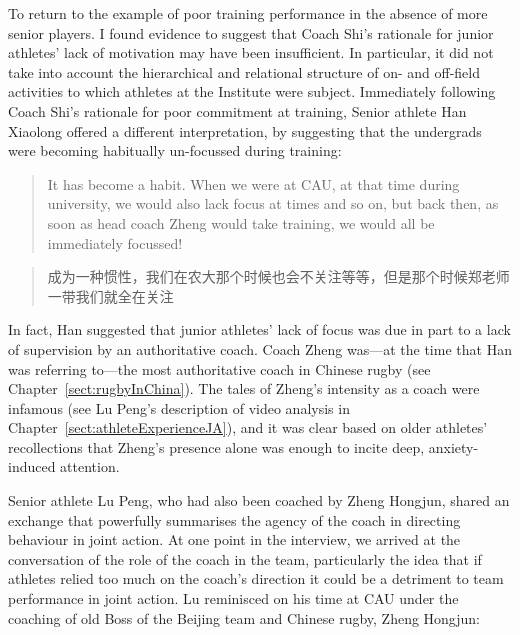 \begin{CJK}{UTF8}{gbsn}
To return to the example of poor training performance in the absence of more senior players. I found evidence to suggest that Coach Shi's rationale for junior athletes' lack of motivation may have been insufficient.  In particular, it did not take into account the hierarchical and relational structure of on- and off-field activities to which athletes at the Institute were subject.  Immediately following Coach Shi's rationale for poor commitment at training, Senior athlete Han Xiaolong offered a different interpretation, by suggesting that the undergrads were becoming habitually un-focussed during training:
     \begin{quote}
       It has become a habit.  When we were at CAU, at that time during university, we would also lack focus at times and so on, but back then, as soon as head coach Zheng would take training, we would all be immediately focussed!
      \end{quote}
      \begin{quote}
       成为一种惯性，我们在农大那个时候也会不关注等等，但是那个时候郑老师一带我们就全在关注
      \end{quote}

In fact, Han suggested that junior athletes' lack of focus was due in part to a lack of supervision by an authoritative coach.  Coach Zheng was---at the time that Han was referring to---the most authoritative coach in Chinese rugby (see Chapter~\ref{sect:rugbyInChina}).  The tales of Zheng's intensity as a coach were infamous (see Lu Peng's description of video analysis in Chapter~\ref{sect:athleteExperienceJA}), and it was clear based on older athletes' recollections that Zheng's presence alone was enough to incite deep, anxiety-induced attention.

Senior athlete Lu Peng, who had also been coached by Zheng Hongjun, shared an exchange that powerfully summarises the agency of the coach in directing behaviour in joint action.  At one point in the interview, we arrived at the conversation of the role of the coach in the team, particularly the idea that if athletes relied too much on the coach's direction it could be a detriment to team performance in joint action.  Lu reminisced on his time at CAU under the coaching of old Boss of the Beijing team and Chinese rugby, Zheng Hongjun:


\end{CJK}
